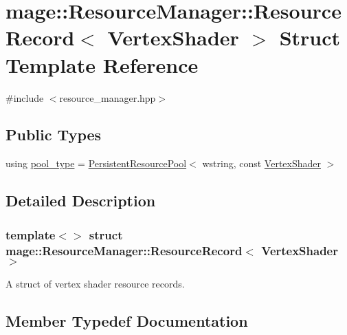 \hypertarget{structmage_1_1_resource_manager_1_1_resource_record_3_01_vertex_shader_01_4}{}\section{mage\+:\+:Resource\+Manager\+:\+:Resource\+Record$<$ Vertex\+Shader $>$ Struct Template Reference}
\label{structmage_1_1_resource_manager_1_1_resource_record_3_01_vertex_shader_01_4}


{\ttfamily \#include $<$resource\+\_\+manager.\+hpp$>$}

\subsection*{Public Types}
\begin{DoxyCompactItemize}
\item 
using \hyperlink{structmage_1_1_resource_manager_1_1_resource_record_3_01_vertex_shader_01_4_acd93f247d6c25fc4f90f0ef2c29c1a74}{pool\+\_\+type} = \hyperlink{classmage_1_1_persistent_resource_pool}{Persistent\+Resource\+Pool}$<$ wstring, const \hyperlink{classmage_1_1_vertex_shader}{Vertex\+Shader} $>$
\end{DoxyCompactItemize}


\subsection{Detailed Description}
\subsubsection*{template$<$$>$\newline
struct mage\+::\+Resource\+Manager\+::\+Resource\+Record$<$ Vertex\+Shader $>$}

A struct of vertex shader resource records. 

\subsection{Member Typedef Documentation}
\hypertarget{structmage_1_1_resource_manager_1_1_resource_record_3_01_vertex_shader_01_4_acd93f247d6c25fc4f90f0ef2c29c1a74}{}\label{structmage_1_1_resource_manager_1_1_resource_record_3_01_vertex_shader_01_4_acd93f247d6c25fc4f90f0ef2c29c1a74} 
